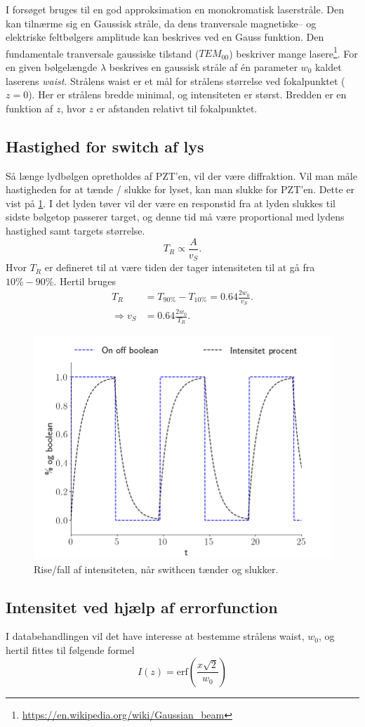\documentclass[main]{subfiles}
\begin{document}
I forsøget bruges til en god approksimation en monokromatisk laserstråle. Den kan tilnærme sig en Gaussisk stråle, da dens tranversale magnetiske-- og elektriske feltbølgers amplitude kan beskrives ved en Gauss funktion. Den fundamentale tranversale gaussiske tilstand ($TEM_{00}$) beskriver mange lasere\footnote{\url{https://en.wikipedia.org/wiki/Gaussian_beam}}. For en given bølgelængde $\lambda$ beskrives en gaussisk stråle af én parameter $w_0$ kaldet laserens \emph{waist}. Strålens waist er et mål for strålens størrelse ved fokalpunktet ($z=0$). Her er strålens bredde minimal, og intensiteten er størst. Bredden er en funktion af $z$, hvor $z$ er afstanden relativt til fokalpunktet.

\subsection{Hastighed for switch af lys}
Så længe lydbølgen opretholdes af PZT'en, vil der være diffraktion. Vil man måle hastigheden for at tænde / slukke for lyset, kan man slukke for PZT'en. Dette er vist på \cref{fig:risefall}.  I det lyden tøver vil der være en responstid fra at lyden slukkes til sidste bølgetop passerer target, og denne tid må være proportional med lydens hastighed samt targets størrelse.
\begin{equation}
    T_R \propto \frac{A}{v_S}.
\end{equation}
Hvor $T_R$ er defineret til at være tiden der tager intensiteten til at gå fra $ 10\% - 90\%$.  Hertil bruges
\begin{align}
    T_R & = T_{90\%} - T_{10\%} = 0.64 \frac{2w_0}{v_S}.\label{eq:risetime} \\
    \Rightarrow v_S & = 0.64 \frac{2w_0}{T_R}.    \label{eq:risetimeIsolere}
\end{align}
\begin{figure}[H]
    \centering
    \includegraphics[width=\linewidth]{tegninger/risefall.png} %
    \caption{Rise/fall af intensiteten, når swithcen tænder og slukker. }
    \label{fig:risefall}
\end{figure}
\subsection{Intensitet ved hjælp af errorfunction}
I databehandlingen vil det have interesse at bestemme strålens waist, $w_0$, og hertil fittes til følgende formel
\begin{equation}
    I(z) = \text{erf}\left( \frac{x\sqrt{2}}{w_0} \right)
    \label{eq:errorfunc}
\end{equation}
\end{document}
